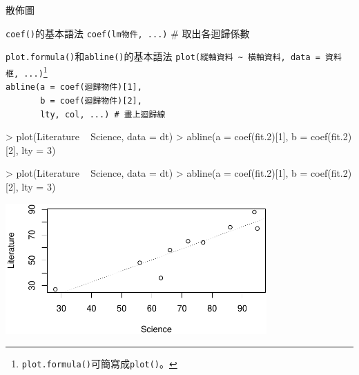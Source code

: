 \documentclass[14pt, aspectratio=43]{beamer}
\let\oldfootnote\footnote
\renewcommand\footnote[1]{\hspace{-0.7em}\oldfootnote{\ignorespaces#1}\hspace{0.5em}}
\begin{document}
\begin{frame}{散佈圖}

\begin{block}{\texttt{coef()}的基本語法}
\verb+coef(lm物件, ...)+  \# 取出各迴歸係數
\end{block}

\begin{block}{\texttt{plot.formula()}和\texttt{abline()}的基本語法}
\verb+plot(縱軸資料 ~ 橫軸資料, data = 資料框, ...)+\oldfootnote{\texttt{plot.formula()}可簡寫成\texttt{plot()}。}\\
\verb+abline(a = coef(迴歸物件)[1],+\\
\verb+       b = coef(迴歸物件)[2],+\\
\verb+       lty, col, ...) # 畫上迴歸線 +
\end{block}

\begin{RC}
> plot(Literature ~ Science, data = dt)
> abline(a = coef(fit.2)[1], b = coef(fit.2)[2], lty = 3)
\end{RC}

\framebreak

\begin{RC}
> plot(Literature ~ Science, data = dt)
> abline(a = coef(fit.2)[1], b = coef(fit.2)[2], lty = 3)
\end{RC}

\begin{center}
\includegraphics[width=0.75\textwidth]{Rplot-sct.pdf}
\end{center}
\end{frame}

%




\end{document}
